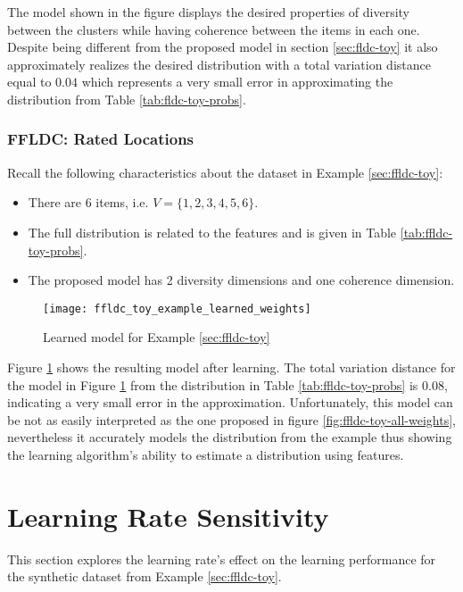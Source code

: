 The model shown in the figure displays the desired properties of diversity between the clusters while having coherence between the items in each one. Despite being different from the proposed model in section \ref{sec:fldc-toy} it also approximately realizes the desired distribution with a total variation distance equal to $0.04$ which represents a very small error in approximating the distribution from Table \ref{tab:fldc-toy-probs}.

\subsubsection{FFLDC: Rated Locations}

Recall the following characteristics about the dataset in Example \ref{sec:ffldc-toy}:

\begin{itemize}
  \item There are 6 items, i.e. $V = \{1,2,3,4,5,6\}$.
  \item The full distribution is related to the features and is given in Table \ref{tab:ffldc-toy-probs}.
  \item The proposed model has 2 diversity dimensions and one coherence dimension.
\end{itemize}

\begin{figure}
  \centering
  \texttt{[image: ffldc\_toy\_example\_learned\_weights]}
  \caption{Learned model for Example \ref{sec:ffldc-toy}}
  \label{fig:ffldc-toy-learned-weights}
\end{figure}

Figure \ref{fig:ffldc-toy-learned-weights} shows the resulting model after learning. The total variation distance for the model in Figure \ref{fig:ffldc-toy-learned-weights} from the distribution in Table \ref{tab:ffldc-toy-probs} is $0.08$, indicating a very small error in the approximation. Unfortunately, this model can be not as easily interpreted as the one proposed in figure \ref{fig:ffldc-toy-all-weights}, nevertheless it accurately models the distribution from the example thus showing the learning algorithm's ability to estimate a distribution using features. 

\section{Learning Rate Sensitivity}

This section explores the learning rate's effect on the learning performance for the synthetic dataset from Example \ref{sec:ffldc-toy}.

